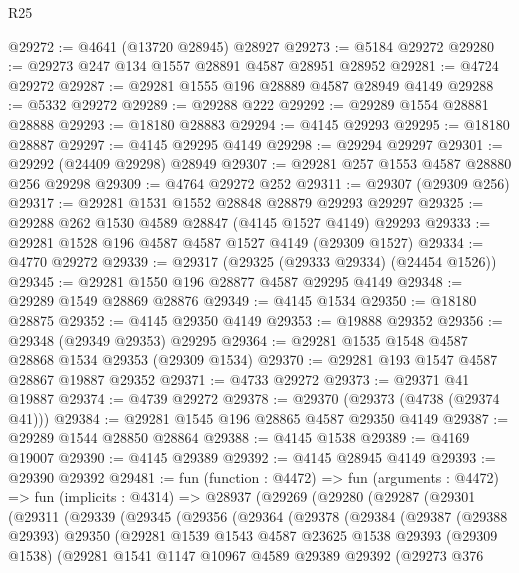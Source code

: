 \begin{lexlean}{R25}
\begin{coremodule}
@29272 := @4641 (@13720 @28945) @28927
@29273 := @5184 @29272
@29280 := @29273 @247 @134 @1557 @28891 @4587 @28951 @28952
@29281 := @4724 @29272
@29287 := @29281 @1555 @196 @28889 @4587 @28949 @4149
@29288 := @5332 @29272
@29289 := @29288 @222
@29292 := @29289 @1554 @28881 @28888
@29293 := @18180 @28883
@29294 := @4145 @29293
@29295 := @18180 @28887
@29297 := @4145 @29295 @4149
@29298 := @29294 @29297
@29301 := @29292 (@24409 @29298) @28949
@29307 := @29281 @257 @1553 @4587 @28880 @256 @29298
@29309 := @4764 @29272 @252
@29311 := @29307 (@29309 @256)
@29317 := @29281 @1531 @1552 @28848 @28879 @29293 @29297
@29325 := @29288 @262 @1530 @4589 @28847 (@4145 @1527 @4149) @29293
@29333 := @29281 @1528 @196 @4587 @4587 @1527 @4149 (@29309 @1527)
@29334 := @4770 @29272
@29339 := @29317 (@29325 (@29333 @29334) (@24454 @1526))
@29345 := @29281 @1550 @196 @28877 @4587 @29295 @4149
@29348 := @29289 @1549 @28869 @28876
@29349 := @4145 @1534
@29350 := @18180 @28875
@29352 := @4145 @29350 @4149
@29353 := @19888 @29352
@29356 := @29348 (@29349 @29353) @29295
@29364 := @29281 @1535 @1548 @4587 @28868 @1534 @29353 (@29309 @1534)
@29370 := @29281 @193 @1547 @4587 @28867 @19887 @29352
@29371 := @4733 @29272
@29373 := @29371 @41 @19887
@29374 := @4739 @29272
@29378 := @29370 (@29373 (@4738 (@29374 @41)))
@29384 := @29281 @1545 @196 @28865 @4587 @29350 @4149
@29387 := @29289 @1544 @28850 @28864
@29388 := @4145 @1538
@29389 := @4169 @19007
@29390 := @4145 @29389
@29392 := @4145 @28945 @4149
@29393 := @29390 @29392
@29481 := fun (function : @4472) =>
  fun (arguments : @4472) =>
  fun (implicits : @4314) =>
  @28937
    (@29269
      (@29280
        (@29287
          (@29301
            (@29311
              (@29339
                (@29345
                  (@29356
                    (@29364
                      (@29378
                        (@29384
                          (@29387
                            (@29388 @29393)
                            @29350
                            (@29281
                              @1539
                              @1543
                              @4587
                              @23625
                              @1538
                              @29393
                              (@29309 @1538)
                              (@29281
                                @1541
                                @1147
                                @10967
                                @4589
                                @29389
                                @29392
                                (@29273
                                  @376

\end{coremodule}
\end{lexlean}
